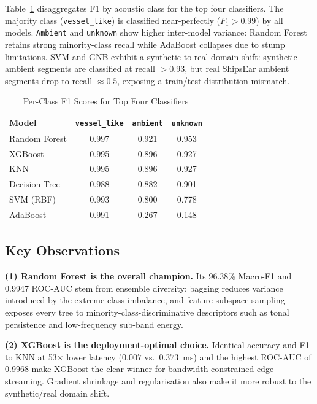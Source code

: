 \documentclass[conference]{IEEEtran}
\begin{document}
Table~\ref{tab:perclass} disaggregates F1 by acoustic class for the top four classifiers. The majority class (\texttt{vessel\_like}) is classified near-perfectly ($F_1 > 0.99$) by all models. \texttt{Ambient} and \texttt{unknown} show higher inter-model variance: Random Forest retains strong minority-class recall while AdaBoost collapses due to stump limitations. SVM and GNB exhibit a synthetic-to-real domain shift: synthetic ambient segments are classified at recall $> 0.93$, but real ShipsEar ambient segments drop to recall $\approx 0.5$, exposing a train/test distribution mismatch.

\begin{table}[h]
\caption{Per-Class F1 Scores for Top Four Classifiers}
\label{tab:perclass}
\centering
\renewcommand{\arraystretch}{1.2}
\begin{tabular}{lccc}
\toprule
\textbf{Model} & \textbf{\texttt{vessel\_like}} & \textbf{\texttt{ambient}} & \textbf{\texttt{unknown}} \\
\midrule
Random Forest   & 0.997 & 0.921 & 0.953 \\
XGBoost         & 0.995 & 0.896 & 0.927 \\
KNN             & 0.995 & 0.896 & 0.927 \\
Decision Tree   & 0.988 & 0.882 & 0.901 \\
SVM (RBF)       & 0.993 & 0.800 & 0.778 \\
AdaBoost        & 0.991 & 0.267 & 0.148 \\
\bottomrule
\end{tabular}
\end{table}

\subsection{Key Observations}

\textbf{(1) Random Forest is the overall champion.} Its 96.38\% Macro-F1 and 0.9947 ROC-AUC stem from ensemble diversity: bagging reduces variance introduced by the extreme class imbalance, and feature subspace sampling exposes every tree to minority-class-discriminative descriptors such as tonal persistence and low-frequency sub-band energy.

\textbf{(2) XGBoost is the deployment-optimal choice.} Identical accuracy and F1 to KNN at 53$\times$ lower latency ($0.007$ vs.\ $0.373$~ms) and the highest ROC-AUC of 0.9968 make XGBoost the clear winner for bandwidth-constrained edge streaming. Gradient shrinkage and regularisation also make it more robust to the synthetic/real domain shift.
\end{document}
